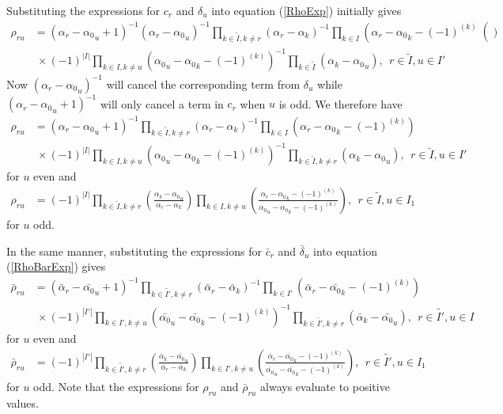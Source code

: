 \documentclass[12pt]{article}
\begin{document}
Substituting the expressions for ${c}_r$ and ${\delta}_u$ into equation 
 (\ref{RhoExp}) initially gives
\begin{align*}
{\rho}_{ru} &= ({\alpha}_r-{\alpha_0}_u + 1)^{-1}({\alpha}_r-{\alpha_0}_u)^{-1} \prod_{k\in \tilde{I},k\neq r} \left(\alpha_r - \alpha_k \right)^{-1}\prod_{k\in
I} \left(\alpha_r - {\alpha_0}_k - (-1)^{(k)}\right() \\
& ~\times (-1)^{|I|} \prod_{k\in I,k\neq u} \left({\alpha_0}_u - {\alpha_0}_k -
(-1)^{(k)}\right)^{-1}\prod_{k\in\tilde{I}} \left(\alpha_k - {\alpha_0}_u \right),\ \ r\in \tilde{I},u\in I' 
\end{align*}
Now $({\alpha}_r-{\alpha_0}_u)^{-1}$ will cancel the corresponding term from $\delta_u$ while $
({\alpha}_r-{\alpha_0}_u + 1)^{-1}$ will only cancel a term in $c_r$ when $u$ is odd. We therefore have
\begin{align*}
{\rho}_{ru} &= ({\alpha}_r-{\alpha_0}_u + 1)^{-1}\prod_{k\in \tilde{I},k\neq r} \left(\alpha_r - \alpha_k \right)^{-1}\prod_{k\in
I} \left(\alpha_r - {\alpha_0}_k - (-1)^{(k)}\right) \\
& ~\times (-1)^{|I|} \prod_{k\in I,k\neq u} \left({\alpha_0}_u - {\alpha_0}_k -
(-1)^{(k)}\right)^{-1}\prod_{k\in\tilde{I},k \neq r} \left(\alpha_k - {\alpha_0}_u \right),\ \ r\in \tilde{I},u\in I' 
\end{align*}
for $u$ even and
\begin{align*}
{\rho}_{ru} &= (-1)^{|I|} \prod_{k\in \tilde{I},k\neq r} 
\left(
\frac 
{\alpha_k - {\alpha_0}_u  }
{\alpha_r - \alpha_k }
\right)
\prod_{k\in I,k \neq u} 
\left(
\frac
{ \alpha_r - {\alpha_0}_k - (-1)^{(k)} }
{{\alpha_0}_u - {\alpha_0}_k - (-1)^{(k)} }
\right)
,\ \ r\in \tilde{I},u\in I_1
\end{align*}
for $u$ odd.

In the same manner, substituting the expressions for $\bar{c}_r$ and $\bar{\delta}_u$ into equation 
 (\ref{RhoBarExp}) gives
\begin{align*}
\bar{\rho}_{ru} &= (\bar{\alpha}_r-\bar{\alpha_0}_u + 1)^{-1}\prod_{k\in \tilde{I'},k\neq r} \left(\bar{\alpha}_r - \bar{\alpha}_k \right)^{-1}\prod_{k\in
I'} \left(\bar{\alpha}_r - \bar{\alpha_0}_k - (-1)^{(k)}\right) \\
& ~\times (-1)^{|I'|} \prod_{k\in I',k\neq u} \left(\bar{\alpha_0}_u - \bar{\alpha_0}_k -
(-1)^{(k)}\right)^{-1}\prod_{k\in\tilde{I'},k \neq r} \left(\bar{\alpha}_k - \bar{\alpha_0}_u \right),\ \ r\in \tilde{I'},u\in I 
\end{align*}
for $u$ even and
\begin{align*}
\bar{\rho}_{ru} &= (-1)^{|I'|} \prod_{k\in \tilde{I'},k\neq r} 
\left(
\frac 
{\bar{\alpha}_k - \bar{\alpha_0}_u  }
{\bar{\alpha}_r - \bar{\alpha}_k }
\right)
\prod_{k\in I',k \neq u} 
\left(
\frac
{ \bar{\alpha}_r - \bar{\alpha_0}_k - (-1)^{(k)} }
{\bar{\alpha_0}_u - \bar{\alpha_0}_k - (-1)^{(k)} }
\right)
,\ \ r\in \tilde{I'},u\in I_1
\end{align*}
for $u$ odd. Note that the expressions for $\rho_{ru}$ and $\bar{\rho}_{ru}$ always evaluate to positive values. 
\end{document}
